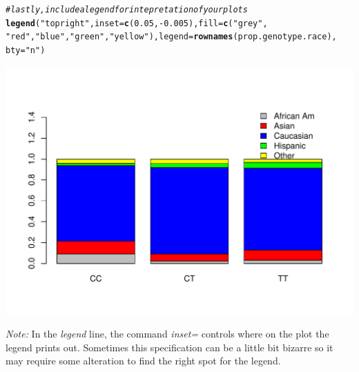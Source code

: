 \documentclass[11pt]{article}\usepackage[]{graphicx}\usepackage[]{color}
\makeatletter
\def\maxwidth{ %
  \ifdim\Gin@nat@width>\linewidth
    \linewidth
  \else
    \Gin@nat@width
  \fi
}
\newcommand{\hlnum}[1]{\textcolor[rgb]{0.686,0.059,0.569}{#1}}%
\newcommand{\hlstr}[1]{\textcolor[rgb]{0.192,0.494,0.8}{#1}}%
\newcommand{\hlcom}[1]{\textcolor[rgb]{0.678,0.584,0.686}{\textit{#1}}}%
\newcommand{\hlopt}[1]{\textcolor[rgb]{0,0,0}{#1}}%
\newcommand{\hlstd}[1]{\textcolor[rgb]{0.345,0.345,0.345}{#1}}%
\newcommand{\hlkwc}[1]{\textcolor[rgb]{0.333,0.667,0.333}{#1}}%
\newcommand{\hlkwd}[1]{\textcolor[rgb]{0.737,0.353,0.396}{\textbf{#1}}}%
\newenvironment{kframe}{%
 \def\at@end@of@kframe{}%
 \ifinner\ifhmode%
  \def\at@end@of@kframe{\end{minipage}}%
  \begin{minipage}{\columnwidth}%
 \fi\fi%
 \def\FrameCommand##1{\hskip\@totalleftmargin \hskip-\fboxsep
 \colorbox{shadecolor}{##1}\hskip-\fboxsep
     \hskip-\linewidth \hskip-\@totalleftmargin \hskip\columnwidth}%
 \MakeFramed {\advance\hsize-\width
   \@totalleftmargin\z@ \linewidth\hsize
   \@setminipage}}%
 {\par\unskip\endMakeFramed%
 \at@end@of@kframe}
\newenvironment{knitrout}{}{} %
\makeatother
\begin{document}
\begin{knitrout}
\begin{kframe}
\begin{alltt}
\hlcom{# lastly, include a legend for intepretation of your plots}
\hlkwd{legend}\hlstd{(}\hlstr{"topright"}\hlstd{,} \hlkwc{inset} \hlstd{=} \hlkwd{c}\hlstd{(}\hlnum{0.05}\hlstd{,} \hlopt{-}\hlnum{0.005}\hlstd{),} \hlkwc{fill} \hlstd{=} \hlkwd{c}\hlstd{(}\hlstr{"grey"}\hlstd{,}
    \hlstr{"red"}\hlstd{,} \hlstr{"blue"}\hlstd{,} \hlstr{"green"}\hlstd{,} \hlstr{"yellow"}\hlstd{),} \hlkwc{legend} \hlstd{=} \hlkwd{rownames}\hlstd{(prop.genotype.race),}
    \hlkwc{bty} \hlstd{=} \hlstr{"n"}\hlstd{)}
\end{alltt}
\end{kframe}
\includegraphics[width=\maxwidth]{figure/unnamed-chunk-29-1} 

\end{knitrout}
\textit{Note:} In the \textit{legend} line, the command  \textit{inset=} controls where on the plot the legend prints out.  Sometimes this specification can be a little bit bizarre so it may require some alteration to find the right spot for the legend.  
\end{document}
